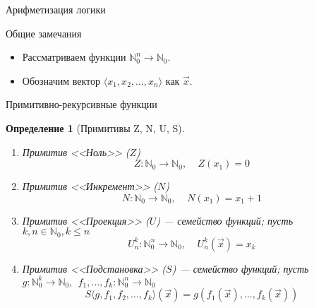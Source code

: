 \documentclass[aspectratio=169]{beamer}
\newtheorem{dfn}{Определение}[section]
\begin{document}
\newcommand\doubleplus{+\kern-1.3ex+\kern0.8ex}
\newcommand\mdoubleplus{\ensuremath{\mathbin{+\mkern-10mu+}}}

\begin{frame}{Арифметизация логики}
\end{frame}

\begin{frame}{Общие замечания}
\begin{itemize}
\item Рассматриваем функции $\mathbb{N}^n_0\to\mathbb{N}_0$.
\item Обозначим вектор $\langle x_1, x_2, \dots, x_n\rangle$ как $\overrightarrow{x}$.
\end{itemize}
\end{frame}

\begin{frame}{Примитивно-рекурсивные функции}

\begin{dfn}[Примитивы Z, N, U, S]
\begin{enumerate}
\item Примитив <<Ноль>> ($Z$) \vspace{-0.3cm}
$$Z: \mathbb{N}_0\to\mathbb{N}_0,\ \ \ \ \ Z(x_1) = 0$$\vspace{-0.5cm}\pause
\item Примитив <<Инкремент>> ($N$) \vspace{-0.3cm}
$$N: \mathbb{N}_0\to\mathbb{N}_0,\ \ \ \ \ N(x_1) = x_1+1$$\vspace{-0.5cm}\pause
\item Примитив <<Проекция>> ($U$) — семейство функций; пусть $k,n \in \mathbb{N}_0, k \le n$\vspace{-0.3cm}
$$U^k_n: \mathbb{N}^n_0 \to \mathbb{N}_0,\ \ \ \ \ U^k_n(\overrightarrow{x}) = x_k$$\vspace{-0.5cm}\pause
\item Примитив <<Подстановка>> ($S$) --- семейство функций; пусть $g: \mathbb{N}^k_0 \to \mathbb{N}_0,\ \ f_1,\dots,f_k: \mathbb{N}^n_0 \to \mathbb{N}_0$
 \vspace{-0.3cm}
$$S\langle g,f_1,f_2,\dots,f_k \rangle (\overrightarrow{x}) = g(f_1(\overrightarrow{x}),\dots,f_k(\overrightarrow{x}))$$
\end{enumerate}
\end{dfn}
\end{frame}
\end{document}

